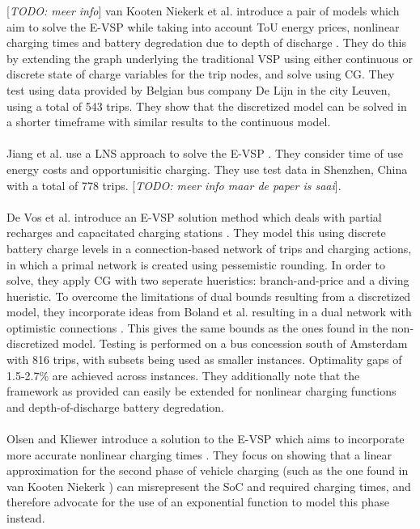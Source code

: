 \documentclass[ht]{article}
\newcommand{\todo}[1]{{\color{red}[\textit{TODO: #1}]}}
\begin{document}
\todo{meer info} van
Kooten Niekerk et al. introduce a pair of models which aim to solve the E-VSP
while taking into account ToU energy prices, nonlinear charging times and
battery degredation due to depth of discharge \cite{vanKootenNiekerk2017}. They
do this by extending the graph underlying the traditional VSP using either
continuous or discrete state of charge variables for the trip nodes,
and solve using CG. They test using data provided
by Belgian bus company De Lijn in the city Leuven, using a total of 543 trips. They show that the
discretized model can be solved in a shorter timeframe with similar results to
the continuous model. \\\\

Jiang et al. use a LNS approach to solve the E-VSP \cite{Jiang2021}. They
consider time of use energy costs and opportunisitic charging. They use test
data in Shenzhen, China with a total of 778 trips. \todo{meer info maar de
  paper is saai}.\\\\

De Vos et al. introduce an E-VSP solution method which deals with partial
recharges and capacitated charging stations \cite{deVos2024}. They model this
using discrete battery charge levels in a connection-based network of trips and
charging actions, in which a primal network is created using pessemistic
rounding. In order to solve, they apply CG with two seperate hueristics:
branch-and-price and a diving hueristic. To overcome the limitations of dual
bounds resulting from a discretized model, they incorporate ideas from Boland
et al. resulting in a dual network with optimistic connections
\cite{Boland2017}. This gives the same bounds as the ones found in the
non-discretized model. Testing is performed on a bus concession south of
Amsterdam with 816 trips, with subsets being used as smaller instances.
Optimality gaps of 1.5-2.7\% are achieved across instances. They additionally
note that the framework as provided can easily be extended for nonlinear
charging functions and depth-of-discharge battery degredation. \\\\

Olsen and Kliewer introduce a solution to the E-VSP which aims to incorporate
more accurate nonlinear charging times \cite{Olsen2020}. They focus on showing
that a linear approximation for the second phase of vehicle charging (such as
the one found in van Kooten Niekerk \cite{vanKootenNiekerk2017}) can
misrepresent the SoC and required charging times, and therefore advocate for
the use of an exponential function to model this phase instead. \\\\
\end{document}
